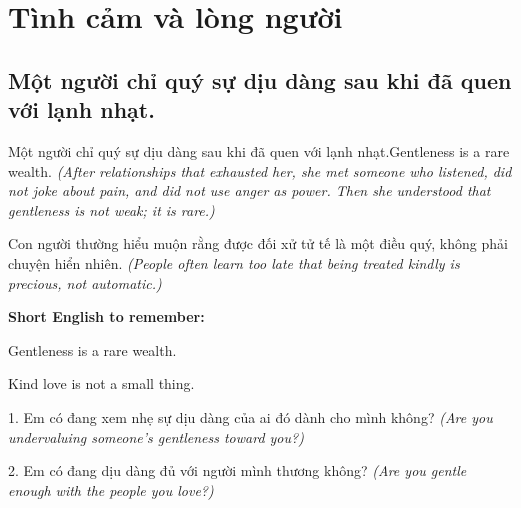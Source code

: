 \chapter{Tình cảm và lòng người}

\section{Một người chỉ quý sự dịu dàng sau khi đã quen với lạnh nhạt.}
\begin{truyen}{Một người chỉ quý sự dịu dàng sau khi đã quen với lạnh nhạt.}{Gentleness is a rare wealth.}
\textit{(After relationships that exhausted her, she met someone who listened, did not joke about pain, and did not use anger as power. Then she understood that gentleness is not weak; it is rare.)}
\end{truyen}
\begin{baihoc}
Con người thường hiểu muộn rằng được đối xử tử tế là một điều quý, không phải chuyện hiển nhiên.
\textit{(People often learn too late that being treated kindly is precious, not automatic.)}
\end{baihoc}
\begin{ghinhoanh}
\textbf{Short English to remember:}

Gentleness is a rare wealth.

Kind love is not a small thing.
\end{ghinhoanh}
\begin{tuhocnhanh}
1. Em có đang xem nhẹ sự dịu dàng của ai đó dành cho mình không? \textit{(Are you undervaluing someone's gentleness toward you?)}

2. Em có đang dịu dàng đủ với người mình thương không? \textit{(Are you gentle enough with the people you love?)}
\end{tuhocnhanh}
\ngancach

